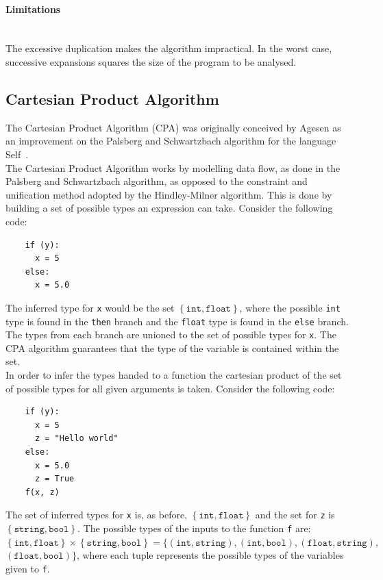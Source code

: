 \documentclass[12pt, titlepage]{article}
\begin{document}
\paragraph*{Limitations}\mbox{}\\
The excessive duplication makes the algorithm impractical. In the worst case, successive expansions squares the size of the program to be analysed.


\subsection{Cartesian Product Algorithm}
The Cartesian Product Algorithm (CPA) was originally conceived by Agesen as an improvement on the Palsberg and Schwartzbach algorithm for the language Self~\cite{agesen95}. \\
\indent The Cartesian Product Algorithm works by modelling data flow, as done in the Palsberg and Schwartzbach algorithm, as opposed to the constraint and unification method adopted by the Hindley-Milner algorithm. This is done by building a set of possible types an expression can take. Consider the following code:
\begin{lstlisting}
    if (y):	
      x = 5     
    else:
      x = 5.0  
\end{lstlisting}
The inferred type for \texttt{x} would be the set $\mathtt{\left\{ {int, float}\right\}}$, where the possible \texttt{int} type is found in the \texttt{then} branch and the \texttt{float} type is found in the \texttt{else} branch. The types from each branch are unioned to the set of possible types for \texttt{x}. The CPA algorithm guarantees that the type of the variable is contained within the set. \\
\indent In order to infer the types handed to a function the cartesian product of the set of possible types for all given arguments is taken. Consider the following code:
\begin{lstlisting}
    if (y):	
      x = 5 
      z = "Hello world"    
    else:
      x = 5.0 
      z = True
    f(x, z)
\end{lstlisting}
The set of inferred types for \texttt{x} is, as before, $\mathtt{\left\{ {int, float}\right\}}$ and the set for \texttt{z} is $\mathtt{\left\{ {string, bool}\right\}}$. The possible types of the inputs to the function \texttt{f} are: $\mathtt{\left\{ {int, float}\right\} \times \left\{ {string, bool}\right\} = \{ (int, string), (int, bool),(float, string),}$ \\ $\mathtt{ (float, bool)\}}$, where each tuple represents the possible types of the variables given to \texttt{f}. \\
\end{document}
